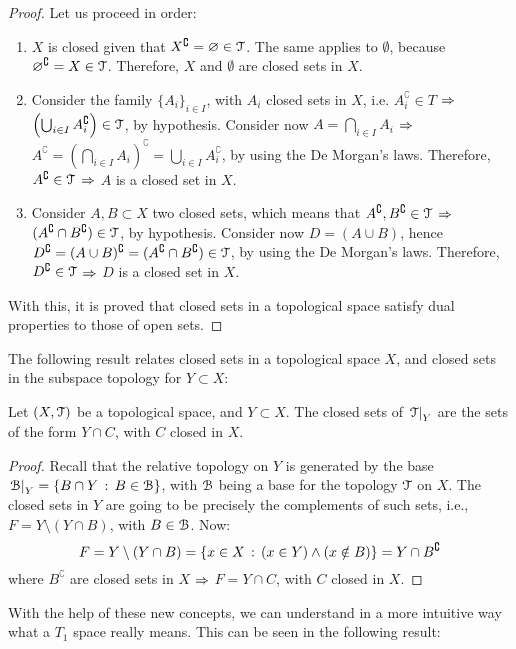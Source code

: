 \begin{proof}
	Let us proceed in order:
	\begin{enumerate}
		\item $X$ is closed given that $X^\complement=\varnothing\in \EuScript{T}$. The same applies to $\emptyset$, because $\varnothing^\complement=X\in \EuScript{T}$.
		Therefore, $X$ and $\emptyset$ are closed sets in $X$.
		\item Consider the family $\{A_i\}_{i\in I}$, with $A_i$ closed sets in $X$, i.e. $A_i^\complement\in T$ $\Rightarrow$ $\left(\bigcup_{i\in I}A_i^\complement\right)\in \EuScript{T}$, by hypothesis. Consider now $A=\bigcap_{i\in I}A_i$ $\Rightarrow$ $A^\complement = \left(\bigcap_{i\in I} A_i \right)^\complement=\bigcup_{i\in I}A_i^\complement$, by using the De Morgan's laws. Therefore, $A^\complement\in \EuScript{T}$ $\Rightarrow$ $A$ is a closed set in $X$.
		\item Consider $A,B\subset X$ two closed sets, which means that $A^\complement, B^\complement\in \EuScript{T}$ $\Rightarrow$ $(A^\complement\cap B^\complement)\in \EuScript{T}$, by hypothesis. Consider now $D=(A\cup B)$, hence $D^\complement = (A\cup B)^\complement = (A^\complement \cap B^\complement)\in \EuScript{T}$, by using the De Morgan's laws. Therefore, $D^\complement\in \EuScript{T}$ $\Rightarrow$ $D$ is a closed set in $X$.
	\end{enumerate}
	With this, it is proved that closed sets in a topological space satisfy dual properties to those of open sets.
\end{proof}

The following result relates closed sets in a topological space $X$, and closed sets in the subspace topology for $Y\subset X$:

\begin{lemma}
	Let $(X, \EuScript{T})$ be a topological space, and $Y\subset X$. The closed sets of $\left.\EuScript{T}\right|_{Y}$ are the sets of the form $Y\cap C$, with $C$ closed in $X$.
\end{lemma}
\begin{proof}
	Recall that the relative topology on $Y$ is generated by the base $\left.\EuScript{B}\right|_{Y}=\left\{B\cap Y\,:\,B\in\EuScript{B}\right\}$, with $\EuScript{B}$ being a base for the topology $\EuScript{T}$ on $X$. The closed sets in $Y$ are going to be precisely the complements of such sets, i.e., $F=Y\setminus(Y\cap B)$, with $B\in\EuScript{B}$. Now:
	$$
	F=Y\setminus(Y\cap B)=\left\{x\in X\,:\,(x\in Y)\land(x\notin B)\right\}=Y\cap B^\complement
	$$
	where $B^\complement$ are closed sets in $X$ $\Rightarrow$ $F=Y\cap C$, with $C$ closed in $X$.
\end{proof}

With the help of these new concepts, we can understand in a more intuitive way what a $T_1$ space really means.
This can be seen in the following result:

